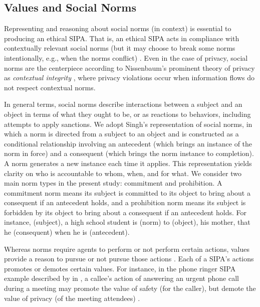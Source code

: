 \subsection{Values and Social Norms}
Representing and reasoning about social norms (in context) is essential to producing an ethical SIPA. 
That is, an ethical SIPA acts in compliance with contextually relevant social norms (but it may choose to break some norms intentionally, e.g., when the norms conflict) \citep{Ajmeri-AAMAS17-Arnor}. 
Even in the case of privacy, social norms are the centerpiece according to Nissenbaum's prominent theory of privacy as \emph{contextual integrity} \citep{Nissenbaum-04:integrity,Nissenbaum-11:online}, where privacy violations occur when information flows do not respect contextual norms.

In general terms, social norms describe interactions between a subject and an object in terms of what they ought to be, or as reactions to behaviors, including attempts to apply sanctions. 
We adopt Singh's  representation of social norms, in which a norm is directed from a subject to an object and is constructed as a conditional relationship involving an antecedent (which brings an instance of the norm in force) and a consequent (which brings the norm instance to completion). A norm generates a new instance each time it applies. 
This representation yields clarity on who is accountable to whom, when, and for what. 
We consider two main norm types in the present study: commitment and prohibition. 
A commitment norm means its subject is committed to its object to bring about a consequent if an antecedent holds, and a prohibition norm means its subject is forbidden by its object to bring about a consequent if an antecedent holds. For instance,  (subject), a high school student is  (norm) to  (object), his mother, that he  (consequent) when he is  (antecedent).

Whereas norms require agents to perform or not perform certain actions, values provide a reason to pursue or not pursue those actions \citep{Dechesne-AIL13-Norms+Values}. 
Each of a SIPA's actions promotes or demotes certain values. 
For instance, in the phone ringer SIPA example described by in \citet{Ajmeri-AAMAS17-Arnor}, a callee's action of answering an urgent phone call during a meeting may promote the value of safety (for the caller), but demote the value of privacy (of the meeting attendees) .

